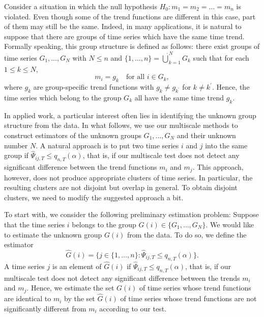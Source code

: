 \documentclass[a4paper,12pt]{article}
\numberwithin{equation}{section}
\begin{document}
Consider a situation in which the null hypothesis $H_0: m_1 = m_2 = \ldots = m_n$ is violated. Even though some of the trend functions are different in this case, part of them may still be the same. Indeed, in many applications, it is natural to suppose that there are groups of time series which have the same time trend. Formally speaking, this group structure is defined as follows: there exist groups of time series $G_1,\ldots,G_N$ with $N \le n$ and $\{1,\ldots,n\} = \mathbin{\dot{\bigcup}}_{k=1}^{N} G_k$ such that for each $1 \le k \le N$,
\[ m_i = g_k \quad \text{for all } i \in G_k, \]
where $g_k$ are group-specific trend functions with $g_k \ne g_{k^\prime}$ for $k \ne k^\prime$. Hence, the time series which belong to the group $G_k$ all have the same time trend $g_k$. 




In applied work, a particular interest often lies in identifying the unknown group structure from the data. In what follows, we use our multiscale methods to construct estimators of the unknown groups $G_1,\ldots,G_N$ and their unknown number $N$. A natural approach is to put two time series $i$ and $j$ into the same group if $\widehat{\Psi}_{ij,T} \le q_{n,T}(\alpha)$, that is, if our multiscale test does not detect any significant difference between the trend functions $m_i$ and $m_j$. This approach, however, does not produce appropriate clusters of time series. In particular, the resulting clusters are not disjoint but overlap in general. To obtain disjoint clusters, we need to modify the suggested approach a bit. 


To start with, we consider the following preliminary estimation problem: Suppose that the time series $i$ belongs to the group $G(i) \in \{G_1,\ldots,G_N\}$. We would like to estimate the unknown group $G(i)$ from the data. To do so, we define the estimator  
\[ \widehat{G}(i) = \big\{ j \in \{1,\ldots,n\} : \widehat{\Psi}_{ij,T} \le q_{n,T}(\alpha) \big\}. \]
A time series $j$ is an element of $\widehat{G}(i)$ if $\widehat{\Psi}_{ij,T} \le q_{n,T}(\alpha)$, that is, if our multiscale test does not detect any significant difference between the trends $m_i$ and $m_j$. Hence, we estimate the set $G(i)$ of time series whose trend functions are identical to $m_i$ by the set $\widehat{G}(i)$ of time series whose trend functions are not significantly different from $m_i$ according to our test.  
\end{document}
